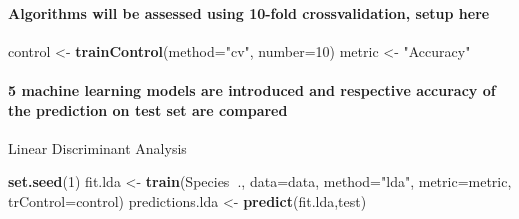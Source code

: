 \documentclass[]{article}
\newenvironment{Shaded}{\begin{snugshade}}{\end{snugshade}}
\newcommand{\KeywordTok}[1]{\textcolor[rgb]{0.13,0.29,0.53}{\textbf{#1}}}
\newcommand{\DataTypeTok}[1]{\textcolor[rgb]{0.13,0.29,0.53}{#1}}
\newcommand{\DecValTok}[1]{\textcolor[rgb]{0.00,0.00,0.81}{#1}}
\newcommand{\FloatTok}[1]{\textcolor[rgb]{0.00,0.00,0.81}{#1}}
\newcommand{\StringTok}[1]{\textcolor[rgb]{0.31,0.60,0.02}{#1}}
\newcommand{\OtherTok}[1]{\textcolor[rgb]{0.56,0.35,0.01}{#1}}
\newcommand{\OperatorTok}[1]{\textcolor[rgb]{0.81,0.36,0.00}{\textbf{#1}}}
\newcommand{\NormalTok}[1]{#1}
\let\oldparagraph\paragraph
\renewcommand{\paragraph}[1]{\oldparagraph{#1}\mbox{}}
\begin{document}
\begin{Shaded}
\end{Shaded}

\paragraph{Algorithms will be assessed using 10-fold crossvalidation,
setup
here}\label{algorithms-will-be-assessed-using-10-fold-crossvalidation-setup-here}

\begin{Shaded}
\begin{Highlighting}[]
\NormalTok{control <-}\StringTok{ }\KeywordTok{trainControl}\NormalTok{(}\DataTypeTok{method=}\StringTok{"cv"}\NormalTok{, }\DataTypeTok{number=}\DecValTok{10}\NormalTok{)}
\NormalTok{metric <-}\StringTok{ "Accuracy"}
\end{Highlighting}
\end{Shaded}

\paragraph{5 machine learning models are introduced and respective
accuracy of the prediction on test set are
compared}\label{machine-learning-models-are-introduced-and-respective-accuracy-of-the-prediction-on-test-set-are-compared}

Linear Discriminant Analysis

\begin{Shaded}
\begin{Highlighting}[]
\KeywordTok{set.seed}\NormalTok{(}\DecValTok{1}\NormalTok{)}
\NormalTok{fit.lda <-}\StringTok{ }\KeywordTok{train}\NormalTok{(Species}\OperatorTok{~}\NormalTok{., }\DataTypeTok{data=}\NormalTok{data, }\DataTypeTok{method=}\StringTok{"lda"}\NormalTok{, }\DataTypeTok{metric=}\NormalTok{metric, }\DataTypeTok{trControl=}\NormalTok{control)}
\NormalTok{predictions.lda <-}\StringTok{ }\KeywordTok{predict}\NormalTok{(fit.lda,test)}
\end{Highlighting}
\end{Shaded}
\end{document}
